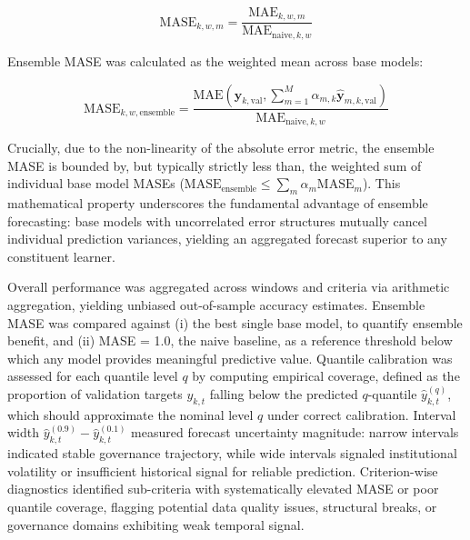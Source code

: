\documentclass[12pt,a4paper]{article}
\begin{document}
\begin{equation}
\label{eq:mase_window}
\text{MASE}_{k,w,m} = \frac{\text{MAE}_{k,w,m}}{\text{MAE}_{\text{naive},k,w}}
\end{equation}

Ensemble MASE was calculated as the weighted mean across base models:

\begin{equation}
\label{eq:mase_ensemble}
\text{MASE}_{k,w,\text{ensemble}}
  = \frac{\text{MAE}\left(\mathbf{y}_{k,\text{val}}, \sum_{m=1}^{M} \alpha_{m,k} \hat{\mathbf{y}}_{m,k,\text{val}}\right)}
         {\text{MAE}_{\text{naive},k,w}}
\end{equation}

Crucially, due to the non-linearity of the absolute error metric, the ensemble MASE is bounded by, but typically strictly less than, the weighted sum of individual base model MASEs ($ \text{MASE}_{\text{ensemble}} \le \sum_m \alpha_m \text{MASE}_m $). This mathematical property underscores the fundamental advantage of ensemble forecasting: base models with uncorrelated error structures mutually cancel individual prediction variances, yielding an aggregated forecast superior to any constituent learner.

Overall performance was aggregated across windows and criteria via arithmetic aggregation, yielding unbiased out-of-sample accuracy estimates. Ensemble MASE was compared against (i) the best single base model, to quantify ensemble benefit, and (ii) MASE = 1.0, the naive baseline, as a reference threshold below which any model provides meaningful predictive value. Quantile calibration was assessed for each quantile level $q$ by computing empirical coverage, defined as the proportion of validation targets $y_{k,t}$ falling below the predicted $q$-quantile $\hat{y}_{k,t}^{(q)}$, which should approximate the nominal level $q$ under correct calibration. Interval width $\hat{y}_{k,t}^{(0.9)} - \hat{y}_{k,t}^{(0.1)}$ measured forecast uncertainty magnitude: narrow intervals indicated stable governance trajectory, while wide intervals signaled institutional volatility or insufficient historical signal for reliable prediction. Criterion-wise diagnostics identified sub-criteria with systematically elevated MASE or poor quantile coverage, flagging potential data quality issues, structural breaks, or governance domains exhibiting weak temporal signal.
\end{document}
